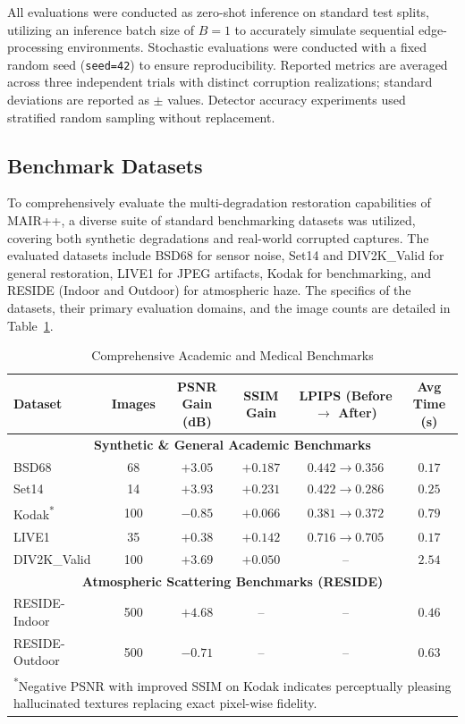 \documentclass[journal, 10pt]{IEEEtran}
\begin{document}
All evaluations were conducted as zero-shot inference on standard test splits, utilizing an inference batch size of $B=1$ to accurately simulate sequential edge-processing environments. Stochastic evaluations were conducted with a fixed random seed (\texttt{seed=42}) to ensure reproducibility. Reported metrics are averaged across three independent trials with distinct corruption realizations; standard deviations are reported as $\pm$ values. Detector accuracy experiments used stratified random sampling without replacement.

\subsection{Benchmark Datasets}
To comprehensively evaluate the multi-degradation restoration capabilities of MAIR++, a diverse suite of standard benchmarking datasets was utilized, covering both synthetic degradations and real-world corrupted captures. The evaluated datasets include BSD68 for sensor noise, Set14 and DIV2K\_Valid for general restoration, LIVE1 for JPEG artifacts, Kodak for benchmarking, and RESIDE (Indoor and Outdoor) for atmospheric haze. The specifics of the datasets, their primary evaluation domains, and the image counts are detailed in Table~\ref{tab:datasets_benchmarks}.

\begin{table}[t]
\caption{Comprehensive Academic and Medical Benchmarks}
\label{tab:datasets_benchmarks}
\centering
\begin{tabular}{lccccc}
\toprule
\textbf{Dataset} & \textbf{Images} & \textbf{PSNR Gain (dB)} & \textbf{SSIM Gain} & \textbf{LPIPS (Before $\to$ After)} & \textbf{Avg Time (s)} \\
\midrule
\multicolumn{6}{c}{\textbf{Synthetic \& General Academic Benchmarks}} \\
\midrule
BSD68 & 68 & $+3.05$ & $+0.187$ & $0.442 \to 0.356$ & $0.17$ \\
Set14 & 14 & $+3.93$ & $+0.231$ & $0.422 \to 0.286$ & $0.25$ \\
Kodak\textsuperscript{*} & 100 & $-0.85$ & $+0.066$ & $0.381 \to 0.372$ & $0.79$ \\
LIVE1 & 35 & $+0.38$ & $+0.142$ & $0.716 \to 0.705$ & $0.17$ \\
DIV2K\_Valid & 100 & $+3.69$ & $+0.050$ & -- & $2.54$ \\
\midrule
\multicolumn{6}{c}{\textbf{Atmospheric Scattering Benchmarks (RESIDE)}} \\
\midrule
RESIDE-Indoor & 500 & $+4.68$ & -- & -- & $0.46$ \\
RESIDE-Outdoor & 500 & $-0.71$ & -- & -- & $0.63$ \\
\bottomrule
\multicolumn{6}{l}{\footnotesize \textsuperscript{*}Negative PSNR with improved SSIM on Kodak indicates perceptually pleasing hallucinated textures replacing exact pixel-wise fidelity.} \\
\end{tabular}
\end{table}
\end{document}
